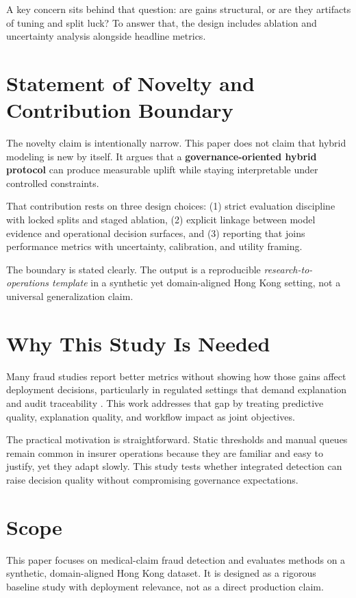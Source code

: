 \documentclass[12pt,a4paper]{report}
\begin{document}
A key concern sits behind that question: are gains structural, or are they artifacts of tuning and split luck? To answer that, the design includes ablation and uncertainty analysis alongside headline metrics.

\section{Statement of Novelty and Contribution Boundary}
The novelty claim is intentionally narrow. This paper does not claim that hybrid modeling is new by itself. It argues that a \textbf{governance-oriented hybrid protocol} can produce measurable uplift while staying interpretable under controlled constraints.

That contribution rests on three design choices: (1) strict evaluation discipline with locked splits and staged ablation, (2) explicit linkage between model evidence and operational decision surfaces, and (3) reporting that joins performance metrics with uncertainty, calibration, and utility framing.

The boundary is stated clearly. The output is a reproducible \emph{research-to-operations template} in a synthetic yet domain-aligned Hong Kong setting, not a universal generalization claim.

\section{Why This Study Is Needed}
Many fraud studies report better metrics without showing how those gains affect deployment decisions, particularly in regulated settings that demand explanation and audit traceability \citep{phua2010,bolton2002}. This work addresses that gap by treating predictive quality, explanation quality, and workflow impact as joint objectives.

The practical motivation is straightforward. Static thresholds and manual queues remain common in insurer operations because they are familiar and easy to justify, yet they adapt slowly. This study tests whether integrated detection can raise decision quality without compromising governance expectations.

\section{Scope}
This paper focuses on medical-claim fraud detection and evaluates methods on a synthetic, domain-aligned Hong Kong dataset. It is designed as a rigorous baseline study with deployment relevance, not as a direct production claim.
\end{document}
